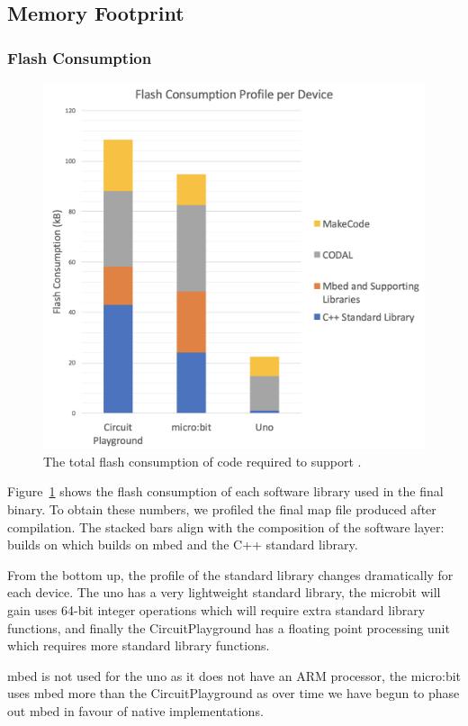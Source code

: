 \subsection{Memory Footprint}

\subsubsection{Flash Consumption}

\begin{figure}[ht]
    \includegraphics[width=.75\columnwidth]{./images/flash-consumption-per-device.png}
\caption{\label{fig:flash-consumption}The total flash consumption of code required to support \MC.}
\end{figure}

Figure~\ref{fig:flash-consumption} shows the flash consumption of each software library used in the final \MC binary. To obtain these numbers, we profiled the final map file produced after compilation. The stacked bars align with the composition of the software layer: \MC builds on \CO which builds on mbed and the C++ standard library.

From the bottom up, the profile of the standard library changes dramatically for each device. The uno has a very lightweight standard library, the microbit will gain uses 64-bit integer operations which will require extra standard library functions, and finally the CircuitPlayground has a floating point processing unit which requires more standard library functions.

mbed is not used for the uno as it does not have an ARM processor, the micro:bit uses mbed more than the CircuitPlayground as over time we have begun to phase out mbed in favour of native implementations.

